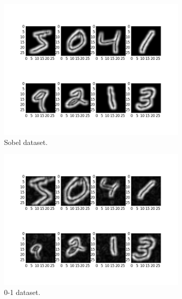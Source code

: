 \begin{figure}
	\centering
	\begin{subfigure}{0.5\textwidth}
		\centering
		\includegraphics[width=1\linewidth]{figures/Sobel.png}
		\caption{Sobel dataset.}\label{fig:sobel}
	\end{subfigure}%
	\begin{subfigure}{0.5\textwidth}
		\centering
		\includegraphics[width=1\linewidth]{figures/0-1.png}
		\caption{0-1 dataset.}\label{fig:0-1}
	\end{subfigure}
	\begin{subfigure}{0.5\textwidth}
		\centering

\end{subfigure}
\end{figure}
